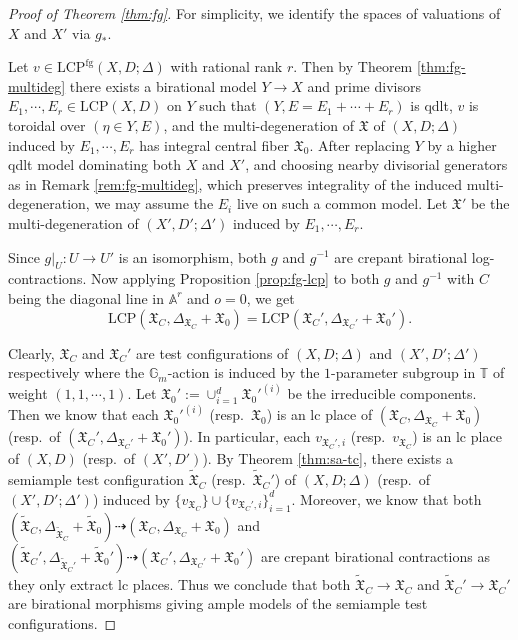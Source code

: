 \documentclass[reqno, 12pt]{amsart}
\theoremstyle{definition}
\newcommand{\bA}{\mathbb{A}}
\newcommand{\bG}{\mathbb{G}}
\newcommand{\bT}{\mathbb{T}}
\newcommand{\hX}{\widehat{X}}
\newcommand{\ord}{\mathrm{ord}}
\newcommand{\fX}{\mathfrak{X}}
\newcommand{\rfg}{\mathrm{fg}}
\newcommand{\LCP}{\mathrm{LCP}}
\newcommand{\tfX}{\widetilde{\mathfrak{X}}}
\numberwithin{equation}{section}
\begin{document}


\begin{proof}[Proof of Theorem \ref{thm:fg}]
For simplicity, we identify the spaces of valuations of $X$ and $X'$ via $g_*$.

Let $v\in \LCP^{\rfg}(X,D;\Delta)$ with rational rank $r$. Then by Theorem \ref{thm:fg-multideg} there exists a birational model $Y \to X$ and prime divisors $E_1,\cdots, E_r\in \LCP(X,D)$  on $Y$ such that $(Y, E= E_1+\cdots+E_r)$ is qdlt, $v$ is toroidal over $(\eta\in Y, E)$, and the multi-degeneration of $\fX$ of $(X,D;\Delta)$ induced by $E_1,\cdots, E_r$ has integral central fiber $\fX_0$. 
After replacing \(Y\) by a higher qdlt model dominating both \(X\) and \(X'\), and choosing nearby divisorial generators as in Remark \ref{rem:fg-multideg}, which preserves integrality of the induced multi-degeneration, we may assume the \(E_i\) live on such a common model.
Let $\fX'$ be the multi-degeneration of $(X', D';\Delta')$ induced by $E_1,\cdots, E_r$. 

Since $g|_U: U\to U'$ is an isomorphism, both $g$ and $g^{-1}$ are crepant birational log-contractions. Now applying Proposition \ref{prop:fg-lcp} to both $g$ and $g^{-1}$ with $C$ being the diagonal line in $\bA^r$ and $o=0$, we get 
\[
\LCP(\fX_C, \Delta_{\fX_C}+ \fX_0) = \LCP(\fX_C', \Delta_{\fX_C'}+ \fX_0').
\]

Clearly,  $\fX_C$ and $\fX_C'$ are test configurations of $(X,D;\Delta)$ and $(X',D';\Delta')$ respectively where the $\bG_m$-action is induced by the $1$-parameter subgroup in $\bT$ of weight $(1,1,\cdots, 1)$.
Let $\fX_0':=\cup_{i=1}^d \fX_0'^{(i)}$ be the irreducible components. Then we know that each $\fX_0'^{(i)}$ (resp.\ $\fX_0$) is an lc place of $(\fX_C, \Delta_{\fX_C} + \fX_0)$ (resp.\ of $(\fX_C', \Delta_{\fX_C'} + \fX_0')$). In particular, each $v_{\fX_C', i}$ (resp.\ $v_{\fX_C}$) is an lc place of $(X,D)$ (resp.\ of $(X',D')$). By Theorem \ref{thm:sa-tc}, there exists a semiample test configuration $\tfX_C$ (resp.\ $\tfX_C'$) of $(X,D;\Delta)$ (resp.\ of $(X',D';\Delta')$) induced by $\{v_{\fX_C}\}\cup \{v_{\fX_C', i}\}_{i=1}^d$. Moreover, we know that both $(\tfX_C, \Delta_{\tfX_C} + \tfX_0)\dashrightarrow (\fX_C, \Delta_{\fX_C} + \fX_0)$ and $(\tfX_C', \Delta_{\tfX_C'} + \tfX_0')\dashrightarrow (\fX_C', \Delta_{\fX_C'} + \fX_0')$ are crepant birational contractions as they only extract lc places. Thus we conclude that both $\tfX_C\to\fX_C$ and $\tfX_C'\to \fX_C'$ are birational morphisms giving ample models of the semiample test configurations.


\end{proof}
\end{document}
